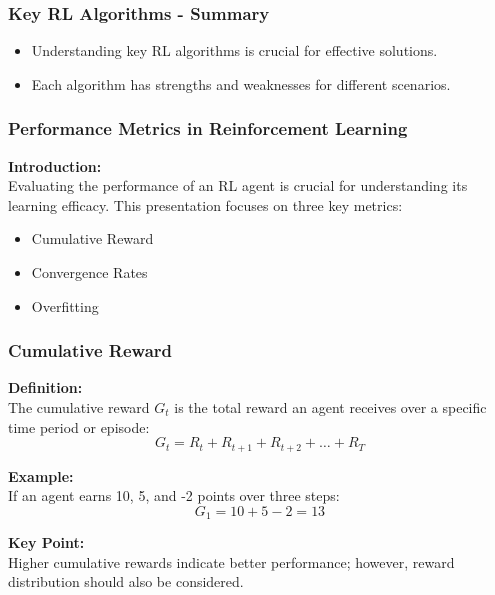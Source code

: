 \documentclass[aspectratio=169]{beamer}
\begin{document}
\begin{frame}[fragile]
    \frametitle{Key RL Algorithms - Summary}
    \begin{itemize}
        \item Understanding key RL algorithms is crucial for effective solutions.
        \item Each algorithm has strengths and weaknesses for different scenarios.
    \end{itemize}
\end{frame}

\begin{frame}[fragile]
    \frametitle{Performance Metrics in Reinforcement Learning}
    
    \textbf{Introduction:} \\
    Evaluating the performance of an RL agent is crucial for understanding its learning efficacy. This presentation focuses on three key metrics:
    \begin{itemize}
        \item Cumulative Reward
        \item Convergence Rates
        \item Overfitting
    \end{itemize}
\end{frame}

\begin{frame}[fragile]
    \frametitle{Cumulative Reward}
    
    \textbf{Definition:} \\
    The cumulative reward \( G_t \) is the total reward an agent receives over a specific time period or episode:
    \begin{equation}
        G_t = R_t + R_{t+1} + R_{t+2} + \ldots + R_T
    \end{equation}
    
    \textbf{Example:} \\
    If an agent earns 10, 5, and -2 points over three steps:
    \begin{equation}
        G_1 = 10 + 5 - 2 = 13
    \end{equation}
    
    \textbf{Key Point:} \\
    Higher cumulative rewards indicate better performance; however, reward distribution should also be considered.
\end{frame}
\end{document}
